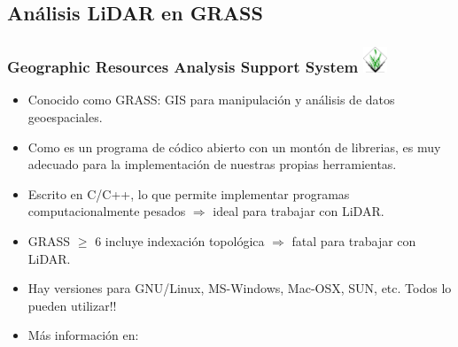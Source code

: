\subsection{Análisis LiDAR en GRASS}
\begin{frame}
    \frametitle{Geographic Resources Analysis Support System\hfill
        \includegraphics[width=0.7cm]{images/grasslogo_transp_big.png}} 
     \begin{itemize}
        \item Conocido como \alert<1>{GRASS}: GIS para manipulación y
            análisis de datos geoespaciales.
        \item Como es un programa de \alert{códico abierto} con un montón de
            librerias, es muy adecuado para la implementación de nuestras
            propias herramientas.
        \item Escrito en C/C++, lo que permite implementar programas
            computacionalmente pesados $\Rightarrow$ \alert{ideal} para trabajar
            con LiDAR.
        \item GRASS $\geq$ 6 incluye indexación topológica $\Rightarrow$
            \alert{fatal} para trabajar con LiDAR.  \item Hay versiones para
            GNU/Linux, MS-Windows, Mac-OSX, SUN, etc.
            \alert{\textexclamdown\textexclamdown Todos lo pueden utilizar!!}
        \item Más información en:
    \end{itemize}
\end{frame}
